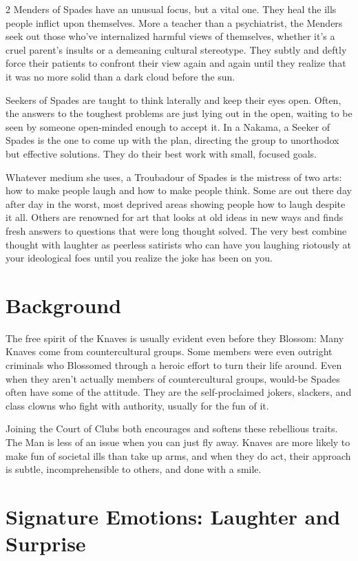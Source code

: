 \begin{multicols}{2}
Menders of Spades have an unusual focus, but a vital one. They heal the ills people inflict upon themselves. More a teacher than a psychiatrist, the Menders seek out those who've internalized harmful views of themselves, whether it's a cruel parent's insults or a demeaning cultural stereotype. They subtly and deftly force their patients to confront their view again and again until they realize that it was no more solid than a dark cloud before the sun.

Seekers of Spades are taught to think laterally and keep their eyes open. Often, the answers to the toughest problems are just lying out in the open, waiting to be seen by someone open-minded enough to accept it. In a Nakama, a Seeker of Spades is the one to come up with the plan, directing the group to unorthodox but effective solutions. They do their best work with small, focused goals. 

Whatever medium she uses, a Troubadour of Spades is the mistress of two arts: how to make people laugh and how to make people think. Some are out there day after day in the worst, most deprived areas showing people how to laugh despite it all. Others are renowned for art that looks at old ideas in new ways and finds fresh answers to questions that were long thought solved. The very best combine thought with laughter as peerless satirists who can have you laughing riotously at your ideological foes until you realize the joke has been on you. 

\section*{Background}

The free spirit of the Knaves is usually evident even before they Blossom: Many Knaves come from countercultural groups. Some members were even outright criminals who Blossomed through a heroic effort to turn their life around. Even when they aren't actually members of countercultural groups, would-be Spades often have some of the attitude. They are the self-proclaimed jokers, slackers, and class clowns who fight with authority, usually for the fun of it. 

Joining the Court of Clubs both encourages and softens these rebellious traits. The Man is less of an issue when you can just fly away. Knaves are more likely to make fun of societal ills than take up arms, and when they do act, their approach is subtle, incomprehensible to others, and done with a smile.

\section*{Signature Emotions: Laughter and Surprise}


\end{multicols}
